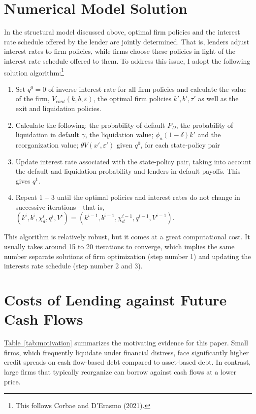 \documentclass[12pt]{article}
\begin{document}
\section{Numerical Model Solution \label{sec: qualitative analysis}}

In the structural model discussed above, optimal firm policies and the interest rate schedule offered by the lender are jointly determined. That is, lenders adjust interest rates to firm policies, while firms choose these policies in light of the interest rate schedule offered to them. To address this issue, I adopt the following solution algorithm:\footnote{This follows Corbae and D'Erasmo (2021).}
\begin{enumerate}
    \item Set $q^0 = 0$ of inverse interest rate for all firm policies and calculate the value of the firm, $V_{cont}(k,b,\varepsilon)$, the optimal firm policies $k', b', \tau'$ as well as the exit and liquidation policies. 
    \item Calculate the following: the probability of default $P_D$, the probability of liquidation in default $\gamma$, the liquidation value; $\phi_a (1-\delta) k'$ and the reorganization value; $\theta V (x', \varepsilon')$ given $q^0$, for each state-policy pair
    \item Update interest rate associated with the state-policy pair, taking into account the default and liquidation probability and lenders in-default payoffs. This gives $q^1$. 
    \item Repeat $1-3$ until the optimal policies and interest rates do not change in successive iterations - that is, $ (k^{i},b^{i},\chi_d^{i},q^{i}, V^{i}) = (k^{i-1},b^{i-1},\chi_d^{i-1}, q^{i-1}, V^{i-1}) $.
\end{enumerate}
This algorithm is relatively robust, but it comes at a great computational cost. It usually takes around 15 to 20 iterations to converge, which implies the same number separate solutions of firm optimization (step number 1) and updating the interests rate schedule (step number 2 and 3). 

\section{Costs of Lending against Future Cash Flows \label{sec:fixed costs}}

\hyperref[tab:motivation]{{Table~\ref*{tab:motivation}}} summarizes the motivating evidence for this paper. Small firms, which frequently liquidate under financial distress, face significantly higher credit spreads on cash flow-based debt compared to asset-based debt. In contrast, large firms that typically reorganize can borrow against cash flows at a lower price. 
\end{document}

